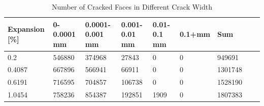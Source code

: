 
\begin{table}[ht!]
  \caption{Number of Cracked Faces in Different Crack Width}
    \centering
    \begin{tabular}{| p{2.0cm} | p{1.6cm} | p{1.6cm} | p{1.6cm} | p{1.6cm} | p{1.6cm} | p{1.6cm} | p{1.6cm} | p{2.0cm} | }
    \hline

	Expansion [\%] & 0-0.0001 mm & 0.0001-0.001 mm & 0.001-0.01 mm & 0.01-0.1 mm & 0.1+mm & Sum \\ \hline

    0.2 &	546880 &	374968 &	27843 &	0 &	0 &	949691\\ \hline
    0.4087 &	667896 &	566941 &	66911 &	0 &	0 &	1301748\\ \hline
    0.6191 &	716595 &	704857 &	106738 &	0 &	0 &	1528190\\ \hline
    1.0454 &	758236 &	854387 &	192851 &	1909 &	0 &	1807383\\ \hline

    \end{tabular}

    \label{}
\end{table}

